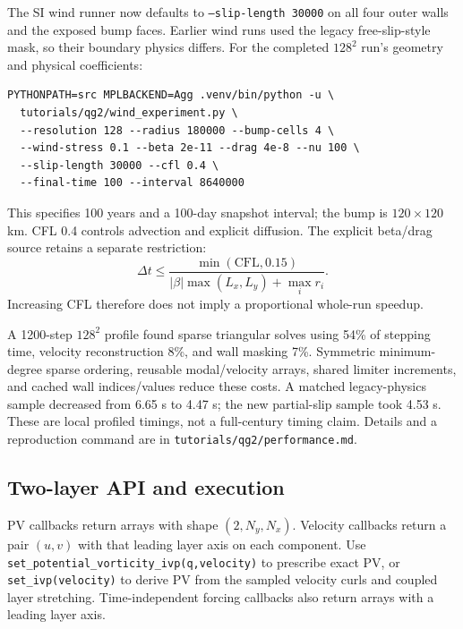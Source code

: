 \documentclass[11pt]{article}
\begin{document}
The SI wind runner now defaults to \texttt{--slip-length 30000} on all
four outer walls and the exposed bump faces. Earlier wind runs used the
legacy free-slip-style mask, so their boundary physics differs.
For the completed $128^2$ run's geometry and physical coefficients:
\begin{verbatim}
PYTHONPATH=src MPLBACKEND=Agg .venv/bin/python -u \
  tutorials/qg2/wind_experiment.py \
  --resolution 128 --radius 180000 --bump-cells 4 \
  --wind-stress 0.1 --beta 2e-11 --drag 4e-8 --nu 100 \
  --slip-length 30000 --cfl 0.4 \
  --final-time 100 --interval 8640000
\end{verbatim}
This specifies 100 years and a 100-day snapshot interval; the bump is
$120\times120$ km. CFL 0.4 controls advection and explicit diffusion.
The explicit beta/drag source retains a separate restriction:
\[
 \Delta t\le\frac{\min(\mathrm{CFL},0.15)}
 {|\beta|\max(L_x,L_y)+\max_i r_i}.
\]
Increasing CFL therefore does not imply a proportional whole-run speedup.

A 1200-step $128^2$ profile found sparse triangular solves using 54\% of
stepping time, velocity reconstruction 8\%, and wall masking 7\%.
Symmetric minimum-degree sparse ordering, reusable modal/velocity arrays,
shared limiter increments, and cached wall indices/values reduce these
costs. A matched legacy-physics sample decreased from 6.65 s to 4.47 s;
the new partial-slip sample took 4.53 s. These are local profiled timings,
not a full-century timing claim. Details and a reproduction command are
in \texttt{tutorials/qg2/performance.md}.

\subsection{Two-layer API and execution}

PV callbacks return arrays with shape $(2,N_y,N_x)$. Velocity callbacks
return a pair $(u,v)$ with that leading layer axis on each component.
Use \texttt{set\_potential\_vorticity\_ivp(q,velocity)} to prescribe exact
PV, or \texttt{set\_ivp(velocity)} to derive PV from the sampled velocity
curls and coupled layer stretching. Time-independent forcing callbacks
also return arrays with a leading layer axis.
\end{document}
